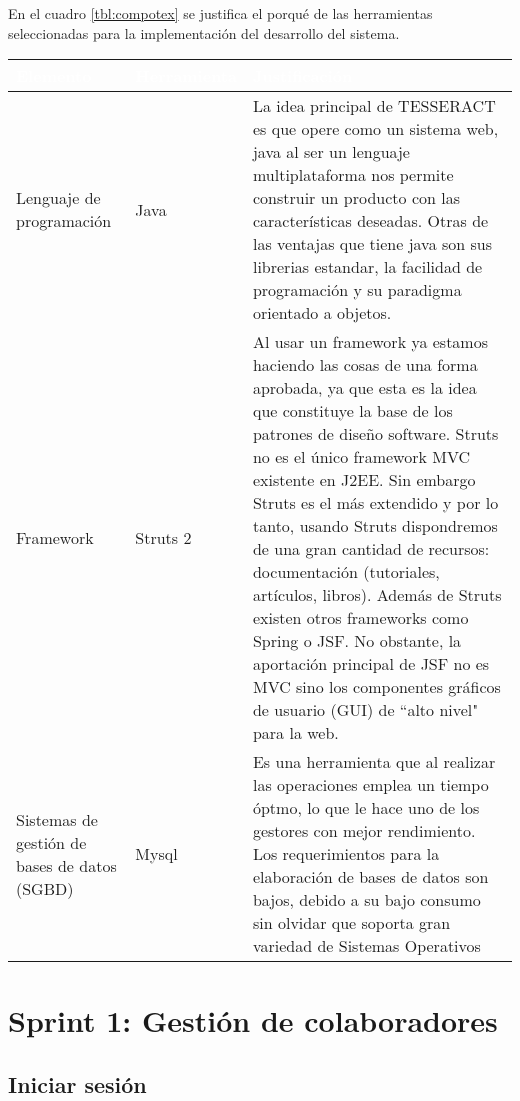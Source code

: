 En el cuadro \ref{tbl:compotex}  se justifica el porqué de las herramientas seleccionadas para la implementación del desarrollo del sistema.

\begin{table}[H]
	\centering
	\begin{tabular}{|p{3cm}|p{2.5cm}|p{10cm}|}
		\hline
		\rowcolor{black} \textcolor{white} {\textbf{Elemento}} & \textcolor{white}{\textbf{Herramienta}} & \textcolor{white}{\textbf{Justificación}}  \\ \hline
		Lenguaje de programación & Java & La idea principal de TESSERACT es que opere como un sistema web, java al ser un lenguaje multiplataforma nos permite construir un producto con las características deseadas. Otras de las ventajas que tiene java son sus librerias estandar, la facilidad de programación y su paradigma orientado a objetos. \\
		\hline
		Framework & Struts 2 & Al usar un framework ya estamos haciendo las cosas de una forma aprobada, ya que esta es la idea que constituye la base de los patrones de diseño software. Struts no es el único framework MVC existente en J2EE. Sin embargo Struts es el más extendido y por lo tanto, usando Struts dispondremos de una gran cantidad de recursos: documentación (tutoriales, artículos, libros).
		Además de Struts existen otros frameworks como Spring o JSF. No obstante, la aportación principal de JSF no es MVC sino los componentes gráficos de usuario (GUI) de ``alto nivel" para la web.\\
		\hline
		Sistemas de gestión de bases de datos (SGBD) & Mysql & Es una herramienta que  al realizar las operaciones emplea un tiempo óptmo, lo que le hace uno de los gestores con mejor rendimiento. Los requerimientos para la elaboración de bases de datos son bajos, debido a su bajo consumo sin olvidar que soporta gran variedad de Sistemas Operativos \\
		\hline
	\end{tabular}
\end{table}



\section{Sprint 1: Gestión de colaboradores}

\subsection{Iniciar sesión}
